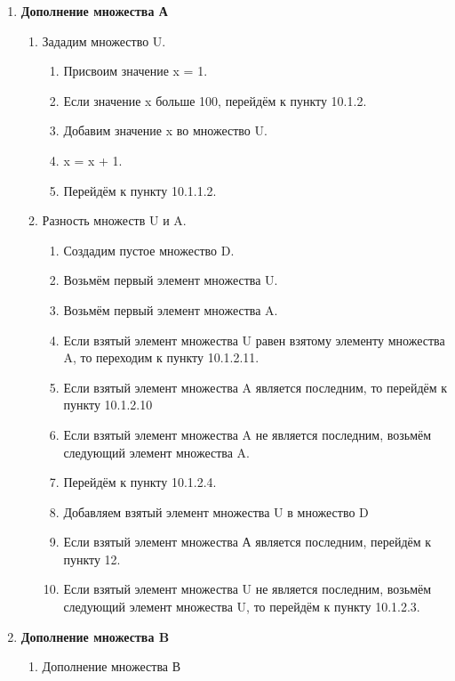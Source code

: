 \documentclass[a4paper,12pt]{extarticle}
\begin{document}
\begin{enumerate}
  \begin{enumerate}[label*=\arabic*.]
    \item \textbf{Дополнение множества А}
    \begin{enumerate}[label*=\arabic*.]
      \item Зададим множество U.
      \begin{enumerate}[label*=\arabic*.]
        \item Присвоим значение x = 1.
        \item Если значение x больше 100, перейдём к пункту 10.1.2.
        \item Добавим значение x во множество U.
        \item x = x + 1.
        \item Перейдём к пункту 10.1.1.2.
      \end{enumerate}
      \item Разность множеств U и A.
      \begin{enumerate}[label*=\arabic*.]
        \item Создадим пустое множество D.
        \item Возьмём первый элемент множества U.
        \item Возьмём первый элемент множества A.
        \item Если взятый элемент множества U равен взятому элементу множества A, то переходим к пункту 10.1.2.11.
        \item Если взятый элемент множества A является последним, то перейдём к пункту 10.1.2.10
        \item Если взятый элемент множества A не является последним, возьмём следующий элемент множества A.
        \item Перейдём к пункту 10.1.2.4.
        \item Добавляем взятый элемент множества U в множество D
        \item Если взятый элемент множества А является последним, перейдём к пункту 12.
        \item Если взятый элемент множества U не является последним, возьмём следующий элемент множества U, то перейдём к пункту 10.1.2.3.
      \end{enumerate}
    \end{enumerate}
    \item \textbf{Дополнение множества B}
    \begin{enumerate}[label*=\arabic*.]
      \item Дополнение множества В
        \begin{enumerate}[label*=\arabic*.]

\end{enumerate}
\end{enumerate}
\end{enumerate}
\end{enumerate}
\end{document}

